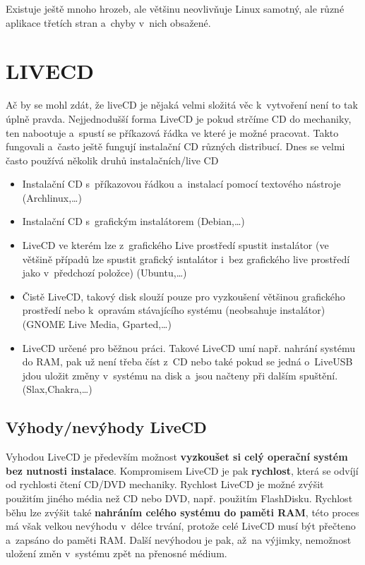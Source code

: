 \documentclass[a4paper,12pt]{article}
\newcommand{\upc}[1]{\uppercase{#1}} %
\begin{document}
Existuje ještě mnoho hrozeb, ale většinu neovlivňuje Linux samotný, ale různé aplikace třetích stran a~chyby v~nich obsažené.

\section{\upc{LiveCD}}
Ač by se mohl zdát, že liveCD je nějaká velmi složitá věc k~vytvoření není to tak úplně pravda. Nejjednodušší forma LiveCD je pokud strčíme CD do mechaniky, ten nabootuje a~spustí se příkazová řádka ve které je možné pracovat. Takto fungovali a~často ještě fungují instalační CD různých distribucí. Dnes se velmi často používá několik druhů instalačních/live CD
\begin{itemize}
 \item Instalační CD s~příkazovou řádkou a~instalací pomocí textového nástroje (Archlinux,…)
 \item Instalační CD s~grafickým instalátorem (Debian,…)
 \item LiveCD ve kterém lze z~grafického Live prostředí spustit instalátor (ve většině případů lze spustit grafický isntalátor i~bez grafického live prostředí jako v~předchozí položce) (Ubuntu,…)
 \item Čistě LiveCD, takový disk slouží pouze pro vyzkoušení většinou grafického prostředí nebo k~opravám stávajícího systému (neobsahuje instalátor) (GNOME Live Media, Gparted,…)
 \item LiveCD určené pro běžnou práci. Takové LiveCD umí např. nahrání systému do RAM, pak už není třeba číst z~CD nebo také pokud se jedná o~LiveUSB jdou uložit změny v~systému na disk a~jsou načteny při dalším spuštění. (Slax,Chakra,…)
\end{itemize}

\subsection{Výhody/nevýhody LiveCD}
Vyhodou LiveCD je především možnost \textbf{vyzkoušet si celý operační systém bez nutnosti instalace}. Kompromisem LiveCD je pak \textbf{rychlost}, která se odvíjí od rychlosti čtení CD/DVD mechaniky. Rychlost LiveCD je možné zvýšit použitím jiného média než CD nebo DVD, např. použitím FlashDisku. Rychlost běhu lze zvýšit také \textbf{nahráním celého systému do paměti RAM}, této proces má však velkou nevýhodu v~délce trvání, protože celé LiveCD musí být přečteno a~zapsáno do paměti RAM. Další nevýhodou je pak, až~na výjimky, nemožnost uložení změn v~systému zpět na přenosné médium.\\
\end{document}
